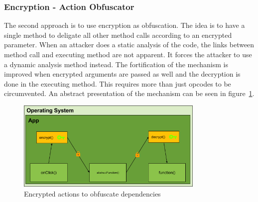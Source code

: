 \subsubsection{Encryption - Action Obfuscator} \label{subsubsectionection:counter-replace-encryption-content-obfuscator}
The second approach is to use encryption as obfuscation.
The idea is to have a single method to deligate all other method calls according to an encrypted parameter.
\newline
When an attacker does a static analysis of the code, the links between method call and executing method are not apparent.
It forces the attacker to use a dynamic analysis method instead.
The fortification of the mechanism is improved when encrypted arguments are passed as well and the decryption is done in the executing method.
This requires more than just opcodes to be circumvented.
\newline
An abstract presentation of the mechanism can be seen in figure~\ref{fig:encryptionAction}.
\begin{figure}[h]
    \centering
    \includegraphics[width=0.8\textwidth]{data/encryptionAction.png}
    \caption{Encrypted actions to obfuscate dependencies}
    \label{fig:encryptionAction}
\end{figure}
